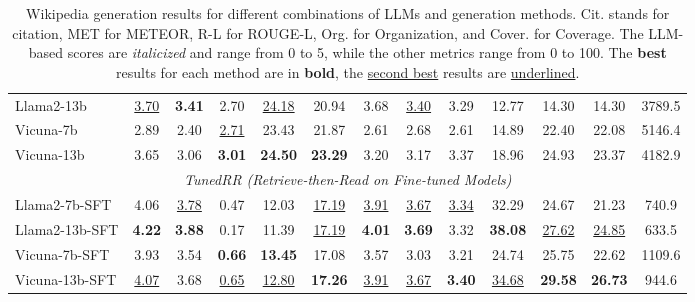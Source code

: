 \documentclass[11pt]{article}
\begin{document}
\begin{table}[h]
{\begin{tabular}{@{}lcccccccccccc@{}}
\multicolumn{1}{l|}{Llama2-13b} & \multicolumn{1}{c}{\underline{3.70}} & \textbf{3.41} & \multicolumn{1}{c|}{2.70} & \underline{24.18} & 20.94 & 3.68 & \underline{3.40} & \multicolumn{1}{c|}{3.29} & 12.77 & 14.30 & \multicolumn{1}{c|}{14.30} & 3789.5 \\
\multicolumn{1}{l|}{Vicuna-7b} & \multicolumn{1}{c}{2.89} & 2.40 & \multicolumn{1}{c|}{\underline{2.71}} & 23.43 & 21.87 & 2.61 & 2.68 & \multicolumn{1}{c|}{2.61} & 14.89 & 22.40 & \multicolumn{1}{c|}{22.08} & 5146.4 \\ 
\multicolumn{1}{l|}{Vicuna-13b} & \multicolumn{1}{c}{3.65} & 3.06 & \multicolumn{1}{c|}{\textbf{3.01}} & \textbf{24.50} & \textbf{23.29} & 3.20 & 3.17 & \multicolumn{1}{c|}{3.37} & 18.96 & 24.93 & \multicolumn{1}{c|}{23.37} & 4182.9 \\
\midrule
\multicolumn{13}{c}{\textit{TunedRR (Retrieve-then-Read on Fine-tuned Models)}} \\ \midrule
\multicolumn{1}{l|}{Llama2-7b-SFT} & \multicolumn{1}{c}{4.06} & \underline{3.78} & \multicolumn{1}{c|}{0.47} & 12.03 & \underline{17.19} & \underline{3.91} & \underline{3.67} & \multicolumn{1}{c|}{\underline{3.34}} & 32.29 & 24.67 & \multicolumn{1}{c|}{21.23} & 740.9 \\
\multicolumn{1}{l|}{Llama2-13b-SFT} & \multicolumn{1}{c}{\textbf{4.22}} & \textbf{3.88} & \multicolumn{1}{c|}{0.17} & 11.39 & \underline{17.19} & \textbf{4.01} & \textbf{3.69} & \multicolumn{1}{c|}{3.32} & \textbf{38.08} & \underline{27.62} & \multicolumn{1}{c|}{\underline{24.85}} & 633.5 \\
\multicolumn{1}{l|}{Vicuna-7b-SFT} & \multicolumn{1}{c}{3.93} & 3.54 & \multicolumn{1}{c|}{\textbf{0.66}} & \textbf{13.45} & 17.08 & 3.57 & 3.03 & \multicolumn{1}{c|}{3.21} & 24.74 & 25.75 & \multicolumn{1}{c|}{22.62} & 1109.6 \\
\multicolumn{1}{l|}{Vicuna-13b-SFT} & \multicolumn{1}{c}{\underline{4.07}} & 3.68 & \multicolumn{1}{c|}{\underline{0.65}} & \underline{12.80} & \textbf{17.26} & \underline{3.91} & \underline{3.67} & \multicolumn{1}{c|}{\textbf{3.40}} & \underline{34.68} & \textbf{29.58} & \multicolumn{1}{c|}{\textbf{26.73}} & 944.6\\
\bottomrule
\end{tabular}
}

\caption{Wikipedia generation results for different combinations of LLMs and generation methods. Cit. stands for citation, MET for METEOR, R-L for ROUGE-L, Org. for Organization, and Cover. for Coverage. The LLM-based scores are \textit{italicized} and range from 0 to 5, while the other metrics range from 0 to 100. The \textbf{best} results for each method are in \textbf{bold}, the \underline{second best} results are \underline{underlined}.}
\label{main-results}
\end{table}
\end{document}
